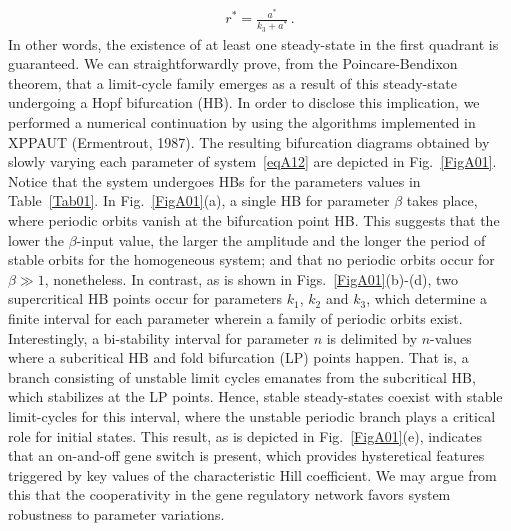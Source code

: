 \documentclass[%
 preprint,
 aip, 
 amsmath,amssymb,
]{revtex4-2}
\begin{document}
	\begin{gather*}
	r^* = \frac{a^*}{k_3+a^*}\,.
	\end{gather*}
	In other words, the existence of at least one steady-state in the first quadrant is guaranteed. We can straightforwardly prove, from the Poincare-Bendixon theorem, that a limit-cycle family emerges as a result of this steady-state undergoing a Hopf bifurcation (HB). In order to disclose this implication, we performed a numerical continuation by using the algorithms implemented in XPPAUT (Ermentrout, 1987). The resulting bifurcation diagrams obtained by slowly varying each parameter of system~\eqref{eqA12} are depicted in Fig.~\ref{FigA01}. Notice that the system undergoes HBs for the parameters values in Table~\ref{Tab01}. In Fig.~\ref{FigA01}(a), a single HB for parameter $\beta$ takes place, where periodic orbits vanish at the bifurcation point HB. This suggests that the lower the $\beta$-input value, the larger the amplitude and the longer the period of stable orbits for the homogeneous system; and that no periodic orbits occur for $\beta\gg1$, nonetheless. In contrast, as is shown in Figs.~\ref{FigA01}(b)-(d), two supercritical HB points occur for parameters $k_1$, $k_2$ and $k_3$, which determine a finite interval for each parameter wherein a family of periodic orbits exist. Interestingly, a bi-stability interval for parameter $n$ is delimited by $n$-values where a subcritical HB and fold bifurcation (LP) points happen. That is, a branch consisting of unstable limit cycles emanates from the subcritical HB, which stabilizes at the LP points. Hence, stable steady-states coexist with stable limit-cycles for this interval, where the unstable periodic branch plays a critical role for initial states. This result, as is depicted in Fig.~\ref{FigA01}(e), indicates that an on-and-off gene switch is present, which provides hysteretical features triggered by key values of the characteristic Hill coefficient. We may argue from this that the cooperativity in the gene regulatory network favors system robustness to parameter variations.
	
%	
	
\end{document}
